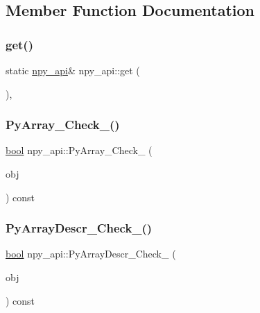 \subsection{Member Function Documentation}
\mbox{\label{structnpy__api_aba897273c4b93bd10e5760f93de85aaf}} 
\subsubsection{\texorpdfstring{get()}{get()}}
{\footnotesize\ttfamily static \mbox{\hyperlink{structnpy__api}{npy\+\_\+api}}\& npy\+\_\+api\+::get (\begin{DoxyParamCaption}{ }\end{DoxyParamCaption})\hspace{0.3cm}{\ttfamily [inline]}, {\ttfamily [static]}}

\mbox{\label{structnpy__api_afc42a9db9fecb476cd2902665a64f891}} 
\subsubsection{\texorpdfstring{PyArray\_Check\_()}{PyArray\_Check\_()}}
{\footnotesize\ttfamily \mbox{\hyperlink{asdl_8h_af6a258d8f3ee5206d682d799316314b1}{bool}} npy\+\_\+api\+::\+Py\+Array\+\_\+\+Check\+\_\+ (\begin{DoxyParamCaption}\item[{\mbox{\hyperlink{_python27_2object_8h_aadc84ac7aed2cfa6f20c25f62bf3dac7}{Py\+Object}} $\ast$}]{obj }\end{DoxyParamCaption}) const\hspace{0.3cm}{\ttfamily [inline]}}

\mbox{\label{structnpy__api_aadb8a33f970e864d5cefbc6f033d5d71}} 
\subsubsection{\texorpdfstring{PyArrayDescr\_Check\_()}{PyArrayDescr\_Check\_()}}
{\footnotesize\ttfamily \mbox{\hyperlink{asdl_8h_af6a258d8f3ee5206d682d799316314b1}{bool}} npy\+\_\+api\+::\+Py\+Array\+Descr\+\_\+\+Check\+\_\+ (\begin{DoxyParamCaption}\item[{\mbox{\hyperlink{_python27_2object_8h_aadc84ac7aed2cfa6f20c25f62bf3dac7}{Py\+Object}} $\ast$}]{obj }\end{DoxyParamCaption}) const\hspace{0.3cm}{\ttfamily [inline]}}



